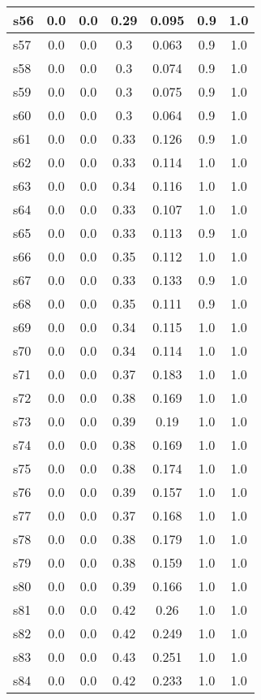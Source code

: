 \documentclass{article}
\begin{document}
\begin{tabular}{|l|c|c|c|c|c|c|}
\hline
s56 &0.0 & 0.0 & 0.29 & 0.095 & 0.9 & 1.0\\
\hline
s57 &0.0 & 0.0 & 0.3 & 0.063 & 0.9 & 1.0\\
\hline
s58 &0.0 & 0.0 & 0.3 & 0.074 & 0.9 & 1.0\\
\hline
s59 &0.0 & 0.0 & 0.3 & 0.075 & 0.9 & 1.0\\
\hline
s60 &0.0 & 0.0 & 0.3 & 0.064 & 0.9 & 1.0\\
\hline
s61 &0.0 & 0.0 & 0.33 & 0.126 & 0.9 & 1.0\\
\hline
s62 &0.0 & 0.0 & 0.33 & 0.114 & 1.0 & 1.0\\
\hline
s63 &0.0 & 0.0 & 0.34 & 0.116 & 1.0 & 1.0\\
\hline
s64 &0.0 & 0.0 & 0.33 & 0.107 & 1.0 & 1.0\\
\hline
s65 &0.0 & 0.0 & 0.33 & 0.113 & 0.9 & 1.0\\
\hline
s66 &0.0 & 0.0 & 0.35 & 0.112 & 1.0 & 1.0\\
\hline
s67 &0.0 & 0.0 & 0.33 & 0.133 & 0.9 & 1.0\\
\hline
s68 &0.0 & 0.0 & 0.35 & 0.111 & 0.9 & 1.0\\
\hline
s69 &0.0 & 0.0 & 0.34 & 0.115 & 1.0 & 1.0\\
\hline
s70 &0.0 & 0.0 & 0.34 & 0.114 & 1.0 & 1.0\\
\hline
s71 &0.0 & 0.0 & 0.37 & 0.183 & 1.0 & 1.0\\
\hline
s72 &0.0 & 0.0 & 0.38 & 0.169 & 1.0 & 1.0\\
\hline
s73 &0.0 & 0.0 & 0.39 & 0.19 & 1.0 & 1.0\\
\hline
s74 &0.0 & 0.0 & 0.38 & 0.169 & 1.0 & 1.0\\
\hline
s75 &0.0 & 0.0 & 0.38 & 0.174 & 1.0 & 1.0\\
\hline
s76 &0.0 & 0.0 & 0.39 & 0.157 & 1.0 & 1.0\\
\hline
s77 &0.0 & 0.0 & 0.37 & 0.168 & 1.0 & 1.0\\
\hline
s78 &0.0 & 0.0 & 0.38 & 0.179 & 1.0 & 1.0\\
\hline
s79 &0.0 & 0.0 & 0.38 & 0.159 & 1.0 & 1.0\\
\hline
s80 &0.0 & 0.0 & 0.39 & 0.166 & 1.0 & 1.0\\
\hline
s81 &0.0 & 0.0 & 0.42 & 0.26 & 1.0 & 1.0\\
\hline
s82 &0.0 & 0.0 & 0.42 & 0.249 & 1.0 & 1.0\\
\hline
s83 &0.0 & 0.0 & 0.43 & 0.251 & 1.0 & 1.0\\
\hline
s84 &0.0 & 0.0 & 0.42 & 0.233 & 1.0 & 1.0\\

\end{tabular}
\end{document}

